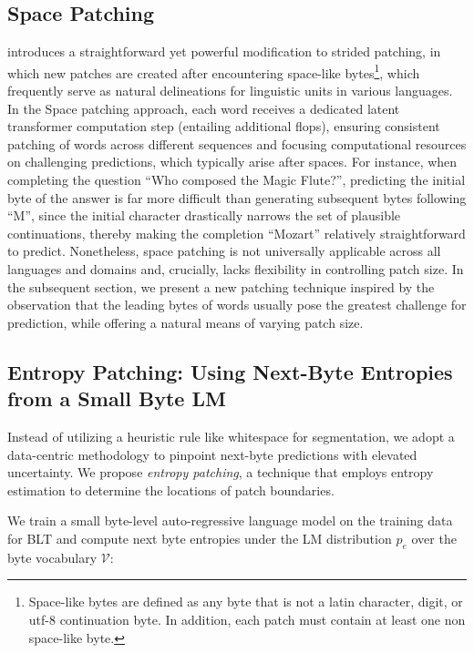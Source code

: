 \subsection{Space Patching}
\label{section:white-patch}

\citet{slagle2024spacebyte} introduces a straightforward yet powerful modification to strided patching, in which new patches are created after encountering space-like bytes\footnote{
    Space-like bytes are defined as any byte that is not a latin character, digit, or utf-8 continuation byte. In addition, each patch must contain at least one non space-like byte. }, which frequently serve as natural delineations for linguistic units in various languages. In the Space patching approach, each word receives a dedicated latent transformer computation step (entailing additional flops), ensuring consistent patching of words across different sequences and focusing computational resources on challenging predictions, which typically arise after spaces. For instance, when completing the question ``Who composed the Magic Flute?\uline{\hspace{.6em}}'', predicting the initial byte of the answer is far more difficult than generating subsequent bytes following ``M'', since the initial character drastically narrows the set of plausible continuations, thereby making the completion ``Mozart'' relatively straightforward to predict. Nonetheless, space patching is not universally applicable across all languages and domains and, crucially, lacks flexibility in controlling patch size. In the subsequent section, we present a new patching technique inspired by the observation that the leading bytes of words usually pose the greatest challenge for prediction, while offering a natural means of varying patch size.

\subsection{Entropy Patching: Using Next-Byte Entropies from a Small Byte LM}
\label{section:dyn-patch}

Instead of utilizing a heuristic rule like whitespace for segmentation, we adopt a data-centric methodology to pinpoint next-byte predictions with elevated uncertainty. We propose \textit{entropy patching}, a technique that employs entropy estimation to determine the locations of patch boundaries.

We train a small byte-level auto-regressive language model on the training data for {\textsc BLT} and compute next byte entropies under the LM distribution $p_{e}$ over the byte vocabulary $\mathcal{V}$:

